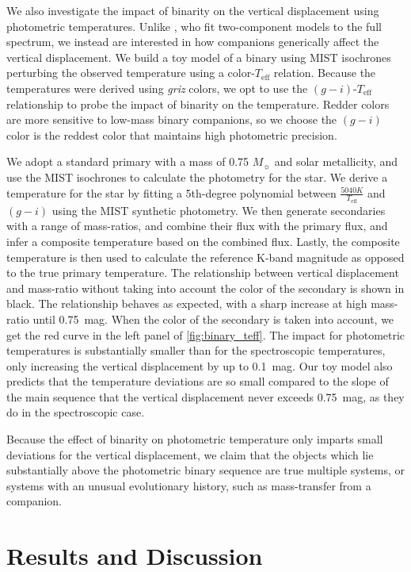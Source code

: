 \documentclass[twocolumn]{aastex6}
\newcommand{\Teff}{\ensuremath{T_{\textrm{eff}}}}
\begin{document}
We also investigate the impact of binarity on the vertical displacement using
photometric temperatures. Unlike \citet{ElBadry18b}, who fit two-component
models to the full spectrum, we instead are interested in how companions
generically affect the vertical displacement. We build a toy model of a binary
using MIST isochrones perturbing the observed temperature using a
color-\Teff{} relation. Because the \citet{Pinsonneault12} temperatures were 
derived using \textit{griz} colors, we opt to use the \((g-i)\)-\Teff{} 
relationship to probe the impact of binarity on the temperature. Redder colors
are more sensitive to low-mass binary companions, so we choose the 
\( (g-i) \) color is the reddest color that maintains high photometric precision.

We adopt a standard primary with a mass of 0.75 \(M_\sun\) and solar metallicity, 
and use the MIST isochrones to calculate the photometry for the star. We
derive a temperature for the star by fitting a 5th-degree polynomial between
\(\tfrac{5040 K}{\Teff}\) and \((g-i)\) using the MIST synthetic photometry. We
then generate secondaries with a range of mass-ratios, and combine their flux
with the primary flux, and infer a composite temperature based on the combined
flux. Lastly, the composite temperature is then used to calculate the reference
K-band magnitude as opposed to the true primary temperature. The relationship
between vertical displacement and mass-ratio without taking into account the
color of the secondary is shown in black. The relationship behaves as expected,
with a sharp increase at high mass-ratio until 0.75~mag. When the color of the 
secondary is taken into account, we get the red curve in the left panel of 
\cref{fig:binary_teff}. The impact for photometric temperatures is
substantially smaller than for the spectroscopic temperatures, only increasing
the vertical displacement by up to 0.1~mag. Our toy model also predicts that
the temperature deviations are so small compared to the slope of the main
sequence that the vertical displacement never exceeds 0.75~mag, as they do in
the spectroscopic case.

Because the effect of binarity on photometric temperature only imparts small 
deviations for the vertical displacement, we claim that the objects which lie
substantially above the photometric binary sequence are true multiple systems,
or systems with an unusual evolutionary history, such as mass-transfer from a
companion. 

\section{Results and Discussion}
\label{sec:results}
\end{document}
